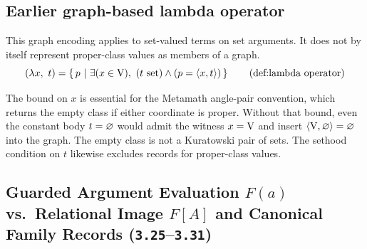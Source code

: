 \subsection{Earlier graph-based lambda operator}
\begin{definition}
This graph encoding applies to set-valued terms on set arguments. It does not by itself represent proper-class values as members of a graph.
\[
(\lambda x,\ t) = \cc{p}{\exists(x\in\V),\ (t\set)\land(p = \langle x,t \rangle)}
\labeltagd{def}{lambda operator}
\]
\end{definition}

The bound on $x$ is essential for the Metamath angle-pair convention,
which returns the empty class if either coordinate is proper. Without
that bound, even the constant body $t=\varnothing$ would admit the witness
$x=\mathrm{V}$ and insert $\langle\mathrm{V},\varnothing\rangle=\varnothing$ into
the graph. The empty class is not a Kuratowski pair of sets. The sethood
condition on $t$ likewise excludes records for proper-class values.

\subsection{Guarded Argument Evaluation $F(a)$ vs.\ Relational Image $F[A]$ and Canonical Family Records (\texttt{3.25}--\texttt{3.31})}
\label{subsec:family_records_and_image_conventions}

